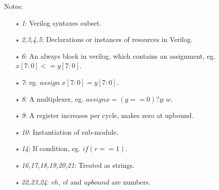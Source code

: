 \normalfont
Notes:
\begin{itemize}\itemsep2pt \parskip0pt 
   \item[$\star$]\textit{1}: Verilog syntaxes subset.
   \item[$\star$]\textit{2,3,4,5}: Declarations or instances of resources in Verilog.
   \item[$\star$]\textit{6}: An always block in verilog, which contains an assignment, eg. $x[7{:}0] {<=} y[7{:}0]$.
   \item[$\star$]\textit{7}: eg. $assign\; x[7{:}0] {=} y[7{:}0]$.
   \item[$\star$]\textit{8}: A multiplexer, eg. $assign x {=} (g{==}0)?y:w$.
   \item[$\star$]\textit{9}: A register increases per cycle, makes zero at upbound.
   \item[$\star$]\textit{10}: Instantiation of sub-module.
   \item[$\star$]\textit{14}: If condition, eg. $if(r{==}1)$.
   \item[$\star$]\textit{16,17,18,19,20,21}: Treated as strings.
   \item[$\star$]\textit{22,23,24}: $vh$, $vl$ and $upbound$ are numbers.
\end{itemize}
